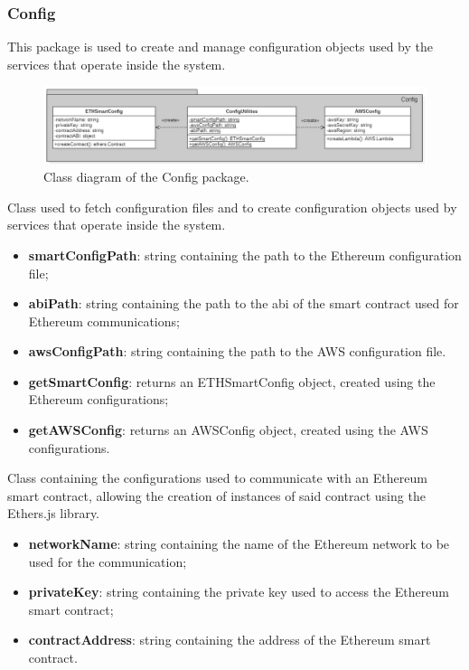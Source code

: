 	\subsubsection{Config}
	This package is used to create and manage configuration objects used by the services that operate inside the system.
	\begin{figure} [h!]
		\centering
		\includegraphics[width=1\linewidth]{diagrammi/etherless-server/Config}
		\caption{Class diagram of the Config package.}
	\end{figure}
	Class used to fetch configuration files and to create configuration objects used by services that operate inside the system.
	\begin{itemize}
		\item \textbf{smartConfigPath}: string containing the path to the Ethereum configuration file;
		\item \textbf{abiPath}: string containing the path to the abi of the smart contract used for Ethereum communications;
		\item \textbf{awsConfigPath}: string containing the path to the AWS configuration file.
	\end{itemize}
	\begin{itemize}
		\item \textbf{getSmartConfig}: returns an ETHSmartConfig object, created using the Ethereum configurations;
		\item \textbf{getAWSConfig}: returns an AWSConfig object, created using the AWS configurations.
	\end{itemize}
	Class containing the configurations used to communicate with an Ethereum smart contract, allowing the creation of instances of said contract using the Ethers.js library.
	\begin{itemize}
		\item \textbf{networkName}: string containing the name of the Ethereum network to be used for the communication;
		\item \textbf{privateKey}: string containing the private key used to access the Ethereum smart contract;
		\item \textbf{contractAddress}: string containing the address of the Ethereum smart contract.
	\end{itemize}
